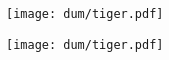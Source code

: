 \documentclass[a4paper]{article}
\makeatletter
\let\orig@includegraphics\includegraphics
\renewcommand\includegraphics[2][]{%
  \message{%
    ^^Jpdfpages file: #2
    ^^Jpdfpages options: #1
    ^^Jpdfpages status: \the\pdfpages@includegraphics@status\space
    ^^J}%
  \orig@includegraphics[#1]{#2}}
\makeatother
\begin{document}
\texttt{[image: dum/tiger.pdf]}



\texttt{[image: dum/tiger.pdf]}

\end{document}
